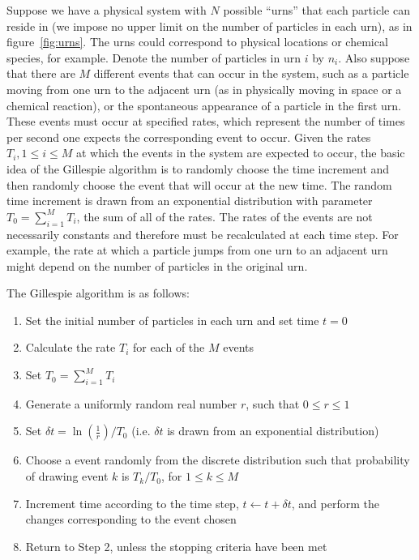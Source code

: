 Suppose we have a physical system with \(N\) possible ``urns'' that each
particle can reside in (we impose no upper limit on the number of particles in
each urn), as in figure~\ref{fig:urns}. The urns could correspond to physical
locations or chemical species, for example. Denote the number of particles in
urn \(i\) by \(n_i\). Also suppose that there are \(M\) different events that
can occur in the system, such as a particle moving from one urn to the adjacent
urn (as in physically moving in space or a chemical reaction), or the
spontaneous appearance of a particle in the first urn. These events must occur
at specified rates, which represent the number of times per second one expects
the corresponding event to occur.  Given the rates \(T_i, 1 \le i \le M\) at
which the events in the system are expected to occur, the basic idea of the
Gillespie algorithm is to randomly choose the time increment and then randomly
choose the event that will occur at the new time. The random time increment is
drawn from an exponential distribution with parameter \(T_0 = \sum_{i=1}^M
T_i\), the sum of all of the rates. The rates of the events are not necessarily
constants and therefore must be recalculated at each time step. For example, the
rate at which a particle jumps from one urn to an adjacent urn might depend on
the number of particles in the original urn.

The Gillespie algorithm is as follows:
\begin{enumerate}
    \item Set the initial number of particles in each urn and set time \(t=0\)
    \item Calculate the rate \(T_i\) for each of the \(M\) events
    \item Set \(T_0 = \sum_{i=1}^M T_i\)
    \item Generate a uniformly random real number \(r\), such that \(0 \le r \le 1\)
    \item Set \(\delta t = \ln\left(\frac{1}{r}\right)/T_0\) (i.e. \(\delta t\)
        is drawn from an exponential distribution)
    \item Choose a event randomly from the discrete distribution such that
        probability of drawing event \(k\) is \(T_k/T_0\), for \(1 \le k \le
        M\)
    \item Increment time according to the time step, \(t \leftarrow t + \delta
        t\), and perform the changes corresponding to the event chosen
    \item Return to Step 2, unless the stopping criteria have been met
\end{enumerate}

